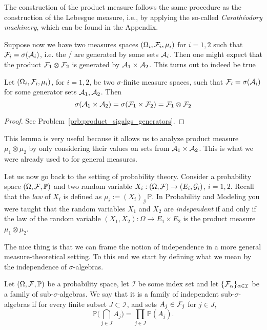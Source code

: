 The construction of the product measure follows the same procedure as the construction of the Lebesgue measure, i.e., by applying the so-called \emph{Carath\'eodory machinery}, which can be found in the Appendix.

Suppose now we have two measures spaces $(\Omega_i, \mathcal F_i, \mu_i)$ for $i = 1,2$ such that $\mathcal F_i = \sigma(\mathcal A_i)$, i.e. the \sigalgs/ are generated by some sets $\mathcal A_i$. Then one might expect that the product $\mathcal F_1 \otimes \mathcal F_2$ is generated by $\mathcal A_1 \times \mathcal A_2$. This turns out to indeed be true

\begin{lemma}\label{lem:product_sigalgs_generators}
Let $(\Omega_i, \mathcal F_i, \mu_i)$, for $i = 1, 2$,  be two $\sigma$-finite measure spaces, such that $\mathcal F_i = \sigma(\mathcal A_i)$ for some generator sets $\mathcal A_1, \mathcal A_2$. Then
\[
	\sigma(\mathcal A_1 \times \mathcal A_2) = \sigma(\mathcal F_1 \times \mathcal F_2) = \mathcal F_1 \otimes \mathcal F_2
\] 
\end{lemma}

\begin{proof}
See Problem~\ref{prb:product_sigalgs_generators}.
\end{proof}

This lemma is very useful because it allows us to analyze product measure $\mu_1 \otimes \mu_2$ by only considering their values on sets from $\mathcal A_1 \times \mathcal A_2$. This is what we were already used to for general measures.

\medskip

Let us now go back to the setting of probability theory. Consider a probability space $(\Omega, \mathcal F, \mathbb{P})$ and two random variable $X_i: (\Omega, \mathcal F) \to (E_i, \mathcal{G}_i)$, $i=1,2$. Recall that the \emph{law} of $X_i$ is defined as $\mu_i:= (X_i)_\# \mathbb{P}$. In Probability and Modeling you were taught that the random variables $X_1$ and $X_2$ are \emph{independent} if and only if the law of the random variable $(X_1, X_2): \Omega \to E_1\times E_2$ is the product measure $\mu_1 \otimes \mu_2$.

The nice thing is that we can frame the notion of independence in a more general measure-theoretical setting. To this end we start by defining what we mean by the independence of $\sigma$-algebras.

\begin{definition}
	Let $(\Omega, \mathcal F, \mathbb{P})$ be a probability space, let $\mathcal{I}$ be some index set and let $\{\mathcal F_\alpha\}_{\alpha \in \mathcal{I}}$ be a family of sub-$\sigma$-algebras. We say that it is a family of independent sub-$\sigma$-algebras if for every finite subset $J \subset \mathcal{I}$, and sets $A_j\in \mathcal F_j$ for $j \in J$,
	\[
	\mathbb{P}\biggl( \bigcap_{j \in J} A_j \biggr) = \prod_{j \in J} \mathbb{P}(A_{j}).
	\]
\end{definition}

